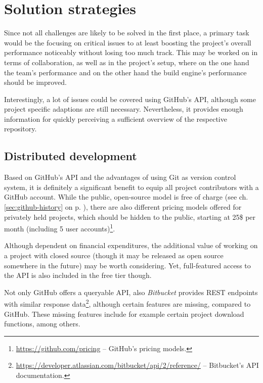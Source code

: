 \section{Solution strategies}
\label{sec:solution-strategies}

Since not all challenges are likely to be solved in the first place, a primary task would be the focusing on critical issues to at least boosting the project's overall performance noticeably without losing too much track. This may be worked on in terms of collaboration, as well as in the project's setup, where on the one hand the team's performance and on the other hand the build engine's performance should be improved.

Interestingly, a lot of issues could be covered using GitHub's API, although some project specific adaptions are still necessary. Nevertheless, it provides enough information for quickly perceiving a sufficient overview of the respective repository.


\subsection{Distributed development}
\label{sec:solutions-distributeddevelopment}

Based on GitHub's API and the advantages of using Git as version control system, it is definitely a significant benefit to equip all project contributors with a GitHub account. While the public, open-source model is free of charge (see ch. \ref{sec:github-history} on p. \pageref{sec:github-history}), there are also different pricing models offered for privately held projects, which should be hidden to the public, starting at 25\$ per month (including 5 user accounts)\footnote{\url{https://github.com/pricing} -- GitHub's pricing models.}.

Although dependent on financial expenditures, the additional value of working on a project with closed source (though it may be released as open source somewhere in the future) may be worth considering. Yet, full-featured access to the API is also included in the free tier though.

Not only GitHub offers a queryable API, also \emph{Bitbucket} provides REST endpoints with similar response data\footnote{\url{https://developer.atlassian.com/bitbucket/api/2/reference/} -- Bitbucket's API documentation.}, although certain features are missing, compared to GitHub. These missing features include for example certain project download functions, among others.

